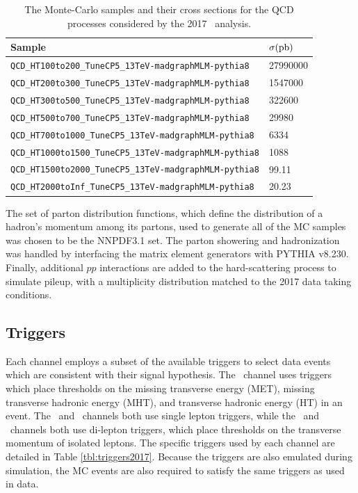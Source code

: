 \begin{table}[htbp]
  \caption[QCD Samples for \VHbb\ 2017]{The Monte-Carlo samples and their cross sections for the QCD processes considered by the 2017 \VHbb\ analysis.}
  \label{tbl:MCQCD}
  \begin{tabularx}{6.5in}{lX}
    \hline
    Sample                                                         & $\sigma (\mathrm{pb})$ \\
    \hline
    \texttt{QCD\_HT100to200\_TuneCP5\_13TeV-madgraphMLM-pythia8}   & 27990000       \\
    \texttt{QCD\_HT200to300\_TuneCP5\_13TeV-madgraphMLM-pythia8}   & 1547000        \\
    \texttt{QCD\_HT300to500\_TuneCP5\_13TeV-madgraphMLM-pythia8}   & 322600         \\
    \texttt{QCD\_HT500to700\_TuneCP5\_13TeV-madgraphMLM-pythia8}   & 29980          \\
    \texttt{QCD\_HT700to1000\_TuneCP5\_13TeV-madgraphMLM-pythia8}  & 6334           \\
    \texttt{QCD\_HT1000to1500\_TuneCP5\_13TeV-madgraphMLM-pythia8} & 1088           \\
    \texttt{QCD\_HT1500to2000\_TuneCP5\_13TeV-madgraphMLM-pythia8} & 99.11          \\
    \texttt{QCD\_HT2000toInf\_TuneCP5\_13TeV-madgraphMLM-pythia8}  & 20.23          \\
    \hline
  \end{tabularx}
\end{table}

The set of parton distribution functions, which define the distribution of a hadron's momentum among its partons, used to generate all of the MC samples was chosen to be the NNPDF3.1\cite{NNPDF} set. The parton showering and hadronization was handled by interfacing the matrix element generators with \textsc{\small PYTHIA} v8.230. Finally, additional $pp$ interactions are added to the hard-scattering process to simulate pileup, with a multiplicity distribution matched to the 2017 data taking conditions.

\subsection{Triggers}

Each channel employs a subset of the available triggers to select data events which are consistent with their signal hypothesis. The \ZnnH\ channel uses triggers which place thresholds on the missing transverse energy (MET), missing transverse hadronic energy (MHT), and transverse hadronic energy (HT) in an event. The \WenH\ and \WmnH\ channels both use single lepton triggers, while the \ZeeH\ and \ZmmH\ channels both use di-lepton triggers, which place thresholds on the transverse momentum of isolated leptons. The specific triggers used by each channel are detailed in Table \ref{tbl:triggers2017}. Because the triggers are also emulated during simulation, the MC events are also required to satisfy the same triggers as used in data.

